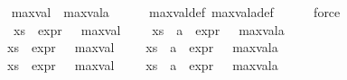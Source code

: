 \begin{isabellebody}
\ \ \isamarkupfalse%
\ {\isachardoublequoteopen}max{\isacharunderscore}{\kern0pt}val\ {\isasymle}\ max{\isacharunderscore}{\kern0pt}val{\isacharunderscore}{\kern0pt}a{\isachardoublequoteclose}\isanewline
\ \ \ \ \isamarkupfalse%
\ max{\isacharunderscore}{\kern0pt}val{\isacharunderscore}{\kern0pt}def\ max{\isacharunderscore}{\kern0pt}val{\isacharunderscore}{\kern0pt}a{\isacharunderscore}{\kern0pt}def\isanewline
\ \ \ \ \isamarkupfalse%
\ force\isanewline
\ \ \isamarkupfalse%
\ {\isachardoublequoteopen}{\isasymexists}{\isasympsi}{\isachardot}{\kern0pt}\ {\isasympsi}\ {\isasymin}\ xs\ {\isasymand}\ expr{\isacharunderscore}{\kern0pt}{}\ {\isasympsi}\ {\isacharequal}{\kern0pt}\ max{\isacharunderscore}{\kern0pt}val\ {\isasymand}\ {\isacharparenleft}{\kern0pt}{\isasymexists}{\isasympsi}{\isachardot}{\kern0pt}\ {\isasympsi}\ {\isasymin}\ {\isacharparenleft}{\kern0pt}xs\ {\isasymunion}\ {\isacharbraceleft}{\kern0pt}a{\isacharbraceright}{\kern0pt}{\isacharparenright}{\kern0pt}\ {\isasymand}\ expr{\isacharunderscore}{\kern0pt}{}\ {\isasympsi}\ {\isacharequal}{\kern0pt}\ max{\isacharunderscore}{\kern0pt}val{\isacharunderscore}{\kern0pt}a{\isacharparenright}{\kern0pt}{\isachardoublequoteclose}\ {\isacharbar}{\kern0pt}\isanewline
{\isachardoublequoteopen}{\isacharparenleft}{\kern0pt}{\isasymnexists}{\isasympsi}{\isachardot}{\kern0pt}\ {\isasympsi}\ {\isasymin}\ xs\ {\isasymand}\ expr{\isacharunderscore}{\kern0pt}{}\ {\isasympsi}\ {\isacharequal}{\kern0pt}\ max{\isacharunderscore}{\kern0pt}val{\isacharparenright}{\kern0pt}\ {\isasymand}\ {\isacharparenleft}{\kern0pt}{\isasymexists}{\isasympsi}{\isachardot}{\kern0pt}\ {\isasympsi}\ {\isasymin}\ {\isacharparenleft}{\kern0pt}xs\ {\isasymunion}\ {\isacharbraceleft}{\kern0pt}a{\isacharbraceright}{\kern0pt}{\isacharparenright}{\kern0pt}\ {\isasymand}\ expr{\isacharunderscore}{\kern0pt}{}\ {\isasympsi}\ {\isacharequal}{\kern0pt}\ max{\isacharunderscore}{\kern0pt}val{\isacharunderscore}{\kern0pt}a{\isacharparenright}{\kern0pt}{\isachardoublequoteclose}\ {\isacharbar}{\kern0pt}\isanewline
{\isachardoublequoteopen}{\isasymexists}{\isasympsi}{\isachardot}{\kern0pt}\ {\isasympsi}\ {\isasymin}\ xs\ {\isasymand}\ expr{\isacharunderscore}{\kern0pt}{}\ {\isasympsi}\ {\isacharequal}{\kern0pt}\ max{\isacharunderscore}{\kern0pt}val\ {\isasymand}\ {\isacharparenleft}{\kern0pt}{\isasymnexists}{\isasympsi}{\isachardot}{\kern0pt}\ {\isasympsi}\ {\isasymin}\ {\isacharparenleft}{\kern0pt}xs\ {\isasymunion}\ {\isacharbraceleft}{\kern0pt}a{\isacharbraceright}{\kern0pt}{\isacharparenright}{\kern0pt}\ {\isasymand}\ expr{\isacharunderscore}{\kern0pt}{}\ {\isasympsi}\ {\isacharequal}{\kern0pt}\ max{\isacharunderscore}{\kern0pt}val{\isacharunderscore}{\kern0pt}a{\isacharparenright}{\kern0pt}{\isachardoublequoteclose}\ {\isacharbar}{\kern0pt}\isanewline

\end{isabellebody}
